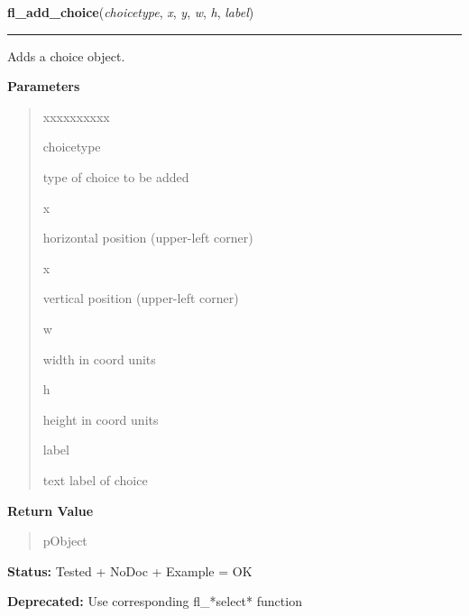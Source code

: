     \label{xformslib:library:fl_add_choice}

    \vspace{0.5ex}

\hspace{.8\funcindent}\begin{boxedminipage}{\funcwidth}

    \raggedright \textbf{fl\_add\_choice}(\textit{choicetype}, \textit{x}, \textit{y}, \textit{w}, \textit{h}, \textit{label})

    \vspace{-1.5ex}

    \rule{\textwidth}{0.5\fboxrule}
\setlength{\parskip}{2ex}
    Adds a choice object.

\setlength{\parskip}{1ex}
      \textbf{Parameters}
      \vspace{-1ex}

      \begin{quote}
        \begin{Ventry}{xxxxxxxxxx}

          \item[choicetype]

          type of choice to be added

          \item[x]

          horizontal position (upper-left corner)

          \item[x]

          vertical position (upper-left corner)

          \item[w]

          width in coord units

          \item[h]

          height in coord units

          \item[label]

          text label of choice

        \end{Ventry}

      \end{quote}

      \textbf{Return Value}
    \vspace{-1ex}

      \begin{quote}
      pObject

      \end{quote}

\textbf{Status:} Tested + NoDoc + Example = OK



\textbf{Deprecated:} Use corresponding fl\_*select* function



    \end{boxedminipage}

